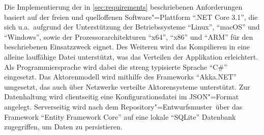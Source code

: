 Die Implementierung der in \autoref{sec:requirements} beschriebenen Anforderungen basiert auf der freien und quelloffenen Software"=Plattform \enquote{.NET Core 3.1}, die sich u.a.\ aufgrund der Unterstützung der Betriebssysteme \enquote{Linux}, \enquote{macOS} und \enquote{Windows}, sowie der Prozessorarchitekturen \enquote{x64}, \enquote{x86} und \enquote{ARM} für den beschriebenen Einsatzzweck eignet.
Des Weiteren wird das Kompilieren in eine alleine lauffähige Datei unterstützt, was das Verteilen der Applikation erleichtert.
Als Programmiersprache wird dabei die streng typisierte Sprache \enquote{C\#} eingesetzt.
Das Aktorenmodell wird mithilfe des Frameworks \enquote{Akka.NET} umgesetzt, das auch über Netzwerke verteilte Aktorensysteme unterstützt.
Zur Datenhaltung wird clientseitig eine Konfigurationsdatei im \ac{JSON}"=Format angelegt.
Serverseitig wird nach dem Repository"=Entwurfsmuster\unskip\ über das Framework \enquote{Entity Framework Core} auf eine lokale \enquote{SQLite} Datenbank zugegriffen, um Daten zu persistieren.
